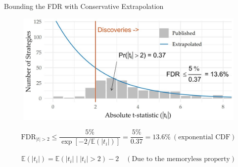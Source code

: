 \documentclass[UTF8, 16pt]{beamer}
\begin{document}
\begin{CJK*}{UTF8}{gbsn}
\begin{frame}{Bounding the FDR with Conservative Extrapolation}
	\begin{figure}[htpb]
  		\begin{center}
    	\includegraphics[width=0.9 \linewidth]
    	{pic/Conservative_Extrapolation.jpg}
  		\end{center}
	\end{figure}
	$$
	\mathrm{FDR}_{|t|>2} \leq \frac{5 \%}{\exp \left[-2 / \mathbb{E}\left(\left|t_{i}\right|\right)\right]}=\frac{5\%}{0.37}=13.6 \% \
	(\text{exponential CDF})
	$$
	\\
	$$
	\mathbb{E}\left(\left|t_{i}\right|\right)=\mathbb{E}\left(\left|t_{i}\right|\mid| t_{i}|>2\right)-2 \quad
	(\text{Due to the memoryless property})
	$$
\end{frame}


\end{CJK*}
\end{document}
